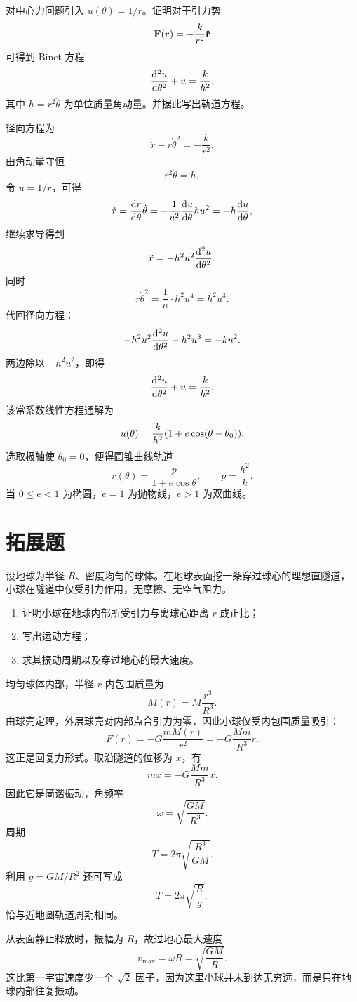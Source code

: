 \begin{university}
对中心力问题引入 $u(\theta)=1/r$。证明对于引力势
\[
\vb{F}(r)=-\frac{k}{r^2}\vu{r}
\]
可得到 Binet 方程
\[
\dv[2]{u}{\theta}+u=\frac{k}{h^2},
\]
其中 $h=r^2\dot\theta$ 为单位质量角动量。并据此写出轨道方程。
\begin{solution}
径向方程为
\[
\ddot r-r\dot\theta^2=-\frac{k}{r^2}.
\]
由角动量守恒
\[
r^2\dot\theta=h,
\]
令 $u=1/r$，可得
\[
\dot r=\dv{r}{\theta}\dot\theta=-\frac{1}{u^2}\dv{u}{\theta}hu^2=-h\dv{u}{\theta},
\]
继续求导得到
\[
\ddot r=-h^2u^2\dv[2]{u}{\theta}.
\]
同时
\[
r\dot\theta^2=\frac{1}{u}\cdot h^2u^4=h^2u^3.
\]
代回径向方程：
\[
-h^2u^2\dv[2]{u}{\theta}-h^2u^3=-ku^2.
\]
两边除以 $-h^2u^2$，即得
\[
\dv[2]{u}{\theta}+u=\frac{k}{h^2}.
\]
该常系数线性方程通解为
\[
u(\theta)=\frac{k}{h^2}\qty(1+e\cos(\theta-\theta_0)).
\]
选取极轴使 $\theta_0=0$，便得圆锥曲线轨道
\[
r(\theta)=\frac{p}{1+e\cos\theta},\qquad p=\frac{h^2}{k}.
\]
当 $0\le e<1$ 为椭圆，$e=1$ 为抛物线，$e>1$ 为双曲线。
\end{solution}
\end{university}

\section{拓展题}

\begin{problem}
设地球为半径 $R$、密度均匀的球体。在地球表面挖一条穿过球心的理想直隧道，小球在隧道中仅受引力作用，无摩擦、无空气阻力。
\begin{enumerate}
  \item 证明小球在地球内部所受引力与离球心距离 $r$ 成正比；
  \item 写出运动方程；
  \item 求其振动周期以及穿过地心的最大速度。
\end{enumerate}
\begin{solution}
均匀球体内部，半径 $r$ 内包围质量为
\[
M(r)=M\frac{r^3}{R^3}.
\]
由球壳定理，外层球壳对内部点合引力为零，因此小球仅受内包围质量吸引：
\[
F(r)=-G\frac{mM(r)}{r^2}=-G\frac{Mm}{R^3}r.
\]
这正是回复力形式。取沿隧道的位移为 $x$，有
\[
m\ddot x=-G\frac{Mm}{R^3}x.
\]
因此它是简谐振动，角频率
\[
\omega=\sqrt{\frac{GM}{R^3}}.
\]
周期
\[
T=2\pi\sqrt{\frac{R^3}{GM}}.
\]
利用 $g=GM/R^2$ 还可写成
\[
T=2\pi\sqrt{\frac{R}{g}},
\]
恰与近地圆轨道周期相同。

从表面静止释放时，振幅为 $R$，故过地心最大速度
\[
v_{\max}=\omega R=\sqrt{\frac{GM}{R}}.
\]
这比第一宇宙速度少一个 $\sqrt2$ 因子，因为这里小球并未到达无穷远，而是只在地球内部往复振动。
\end{solution}
\end{problem}

